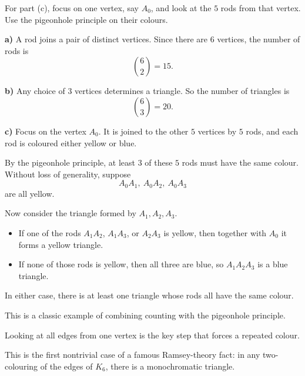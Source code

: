 \begin{hint}
For part (c), focus on one vertex, say $A_0$, and look at the $5$ rods from that vertex. Use the pigeonhole principle on their colours.
\end{hint}

\begin{solution}
\textbf{a)} A rod joins a pair of distinct vertices. Since there are $6$ vertices, the number of rods is
\[
\binom{6}{2}=15.
\]

\textbf{b)} Any choice of $3$ vertices determines a triangle. So the number of triangles is
\[
\binom{6}{3}=20.
\]

\textbf{c)} Focus on the vertex $A_0$. It is joined to the other $5$ vertices by $5$ rods, and each rod is coloured either yellow or blue.

By the pigeonhole principle, at least $3$ of these $5$ rods must have the same colour. Without loss of generality, suppose
\[
A_0A_1,\ A_0A_2,\ A_0A_3
\]
are all yellow.

Now consider the triangle formed by $A_1,A_2,A_3$.
\begin{itemize}[leftmargin=*]
  \item If one of the rods $A_1A_2$, $A_1A_3$, or $A_2A_3$ is yellow, then together with $A_0$ it forms a yellow triangle.
  \item If none of those rods is yellow, then all three are blue, so $A_1A_2A_3$ is a blue triangle.
\end{itemize}

In either case, there is at least one triangle whose rods all have the same colour.
\end{solution}

\begin{takeaways}
\item This is a classic example of combining counting with the pigeonhole principle.
\item Looking at all edges from one vertex is the key step that forces a repeated colour.
\item This is the first nontrivial case of a famous Ramsey-theory fact: in any two-colouring of the edges of $K_6$, there is a monochromatic triangle.
\end{takeaways}

